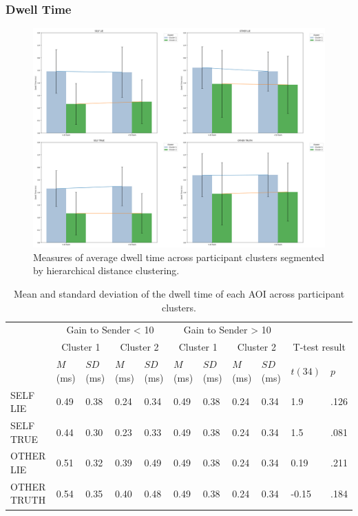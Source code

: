 \documentclass[man, floatsintext]{apa7}
\begin{document}
\subsubsection{Dwell Time}

 \begin{figure}[H]
	\includegraphics[width=\linewidth]{figures/GainClusterTiles.png}
	\caption{Measures of average dwell time across participant clusters segmented by hierarchical distance clustering.}
	\label{fig:DwellTimesPerGainByPIDCluster}
\end{figure}

\begin{table}[H]
	\centering
	\begin{tabular}{|p{3.2cm}|p{0.7cm}|p{0.7cm}|p{0.7cm}|p{0.7cm}|p{0.9cm}|p{0.7cm}|p{0.7cm}|p{0.7cm}|p{0.8cm}|p{0.7cm}|}
		\hline
		\multirow{2}{*}{} & \multicolumn{4}{c|}{Gain to Sender < 10} & \multicolumn{4}{c|}{Gain to Sender > 10} & \multicolumn{2}{c|}{} \\ \cline{2-11}
		\multirow{2}{*}{} & \multicolumn{2}{c|}{Cluster 1} & \multicolumn{2}{c|}{Cluster 2} & \multicolumn{2}{c|}{Cluster 1} & \multicolumn{2}{c|}{Cluster 2} & \multicolumn{2}{c|}{T-test result} \\ \cline{2-11}
		& $M$ (ms) &$SD$ (ms) & $M$ (ms) & $SD$ (ms) & $M$ (ms) &$SD$ (ms) & $M$ (ms) & $SD$ (ms) & $t(34)$ & $p$ \\ \hline
		SELF LIE& 0.49 & 0.38 & 0.24 & 0.34 & 0.49 & 0.38 & 0.24 & 0.34 & 1.9 & .126  \\ \hline
		SELF TRUE & 0.44 & 0.30 & 0.23 & 0.33 & 0.49 & 0.38 & 0.24 & 0.34 & 1.5 & .081  \\ \hline
		OTHER LIE & 0.51 & 0.32 & 0.39 & 0.49 & 0.49 & 0.38 & 0.24 & 0.34 & 0.19 & .211 \\ \hline
		OTHER TRUTH & 0.54 & 0.35 & 0.40 & 0.48 & 0.49 & 0.38 & 0.24 & 0.34 & -0.15 & .184 \\ \hline
	\end{tabular}
	\vspace{0.3cm}
	\caption{Mean and standard deviation of the dwell time of each AOI across participant clusters. }
	\label{tab:NetGainDwellByPIDCluster}
\end{table}
\end{document}
